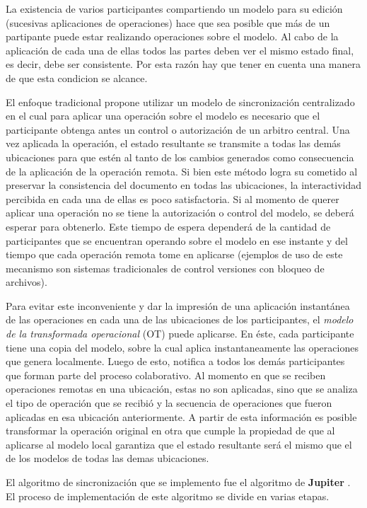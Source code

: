 \documentclass[12pt,a4paper]{article}
\begin{document}
	La existencia de varios participantes compartiendo un modelo para su edición (sucesivas aplicaciones de
	operaciones) hace que sea posible que más de un partipante puede estar realizando operaciones sobre el modelo.
	Al cabo de la aplicación de cada una de ellas todos las partes deben ver el mismo estado final, es decir,
	debe ser consistente. Por esta razón hay que tener en cuenta una manera de que esta condicion se alcance.

	El enfoque tradicional propone utilizar un modelo de sincronización centralizado en el cual para aplicar una
	operación sobre el modelo es necesario que el participante obtenga antes un control o autorización de un
	arbitro central. Una vez aplicada la operación, el estado resultante se transmite a todas las demás ubicaciones
	para que estén al tanto de los cambios generados como consecuencia de la aplicación de la operación remota.
	Si bien este método logra su cometido al preservar la consistencia del documento en todas las ubicaciones, la
	interactividad percibida en cada una de ellas es poco satisfactoria. Si al momento de querer aplicar una 
	operación no se tiene la autorización o control del modelo, se deberá esperar para obtenerlo. 
	Este tiempo de espera dependerá de la cantidad de participantes que se encuentran operando sobre el modelo
	en ese instante y del tiempo que cada operación remota tome en aplicarse (ejemplos de uso de este mecanismo
	son sistemas tradicionales de control versiones con bloqueo de archivos).

	Para evitar este inconveniente y dar la impresión de una aplicación instantánea de las operaciones en cada
	una de las ubicaciones de los participantes, el \textit{modelo de la transformada operacional} (OT) puede
	aplicarse. En éste, cada participante tiene una copia del modelo, sobre la cual aplica instantaneamente
	las operaciones que genera localmente. Luego de esto, notifica a todos los demás participantes que forman
	parte del proceso colaborativo.
	Al momento en que se reciben operaciones remotas en una ubicación, estas no son aplicadas, sino que se analiza
	el tipo de operación que se recibió y la secuencia de operaciones que fueron aplicadas en esa ubicación
	anteriormente. A partir de esta información es posible transformar la operación original en otra que cumple
	la propiedad de que al aplicarse al modelo local garantiza que el estado resultante será el mismo que el de
	los modelos de todas las demas ubicaciones.

	El algoritmo de sincronización que se implemento fue el algoritmo de \textbf{Jupiter} \cite{jupiter}. El proceso de implementación
	de este algoritmo se divide en varias etapas.
	
\end{document}
